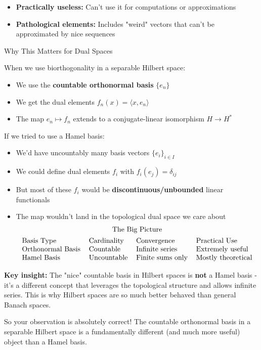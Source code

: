 \documentclass[aps,preprint]{revtex4}
\newenvironment{answer}
  {\begin{tcolorbox}[colback=green!5!white,colframe=green!75!black,title=Answer]}
  {\end{tcolorbox}}
\begin{document}
\begin{answer}
\begin{itemize}
\item \textbf{Practically useless:} Can't use it for computations or
approximations

\item \textbf{Pathological elements:} Includes "weird" vectors that can't be
approximated by nice sequences
\end{itemize}

Why This Matters for Dual Spaces

When we use biorthogonality in a separable Hilbert space:

\begin{itemize}
\item We use the \textbf{countable orthonormal basis} $\{e_n\}$

\item We get the dual elements $f_n(x) = \langle x, e_n \rangle$

\item The map $e_n \mapsto f_n$ extends to a conjugate-linear isomorphism $H
\to H^*$
\end{itemize}

If we tried to use a Hamel basis:

\begin{itemize}
\item We'd have uncountably many basis vectors $\{e_i\}_{i \in I}$

\item We could define dual elements $f_i$ with $f_i(e_j) = \delta_{ij}$

\item But most of these $f_i$ would be \textbf{discontinuous/unbounded}
linear functionals

\item The map wouldn't land in the topological dual space we care about%
\begin{gather*}
\text{The Big Picture} \\
\begin{tabular}{llll}
Basis Type & Cardinality & Convergence & Practical Use \\ 
Orthonormal Basis & Countable & Infinite series & Extremely useful \\ 
Hamel Basis & Uncountable & Finite sums only & Mostly theoretical%
\end{tabular}%
\end{gather*}
\end{itemize}

\textbf{Key insight:} The "nice" countable basis in Hilbert spaces is 
\textbf{not} a Hamel basis - it's a different concept that leverages the
topological structure and allows infinite series. This is why Hilbert spaces
are so much better behaved than general Banach spaces.

So your observation is absolutely correct! The countable orthonormal basis
in a separable Hilbert space is a fundamentally different (and much more
useful) object than a Hamel basis.
\end{answer}
\end{document}
